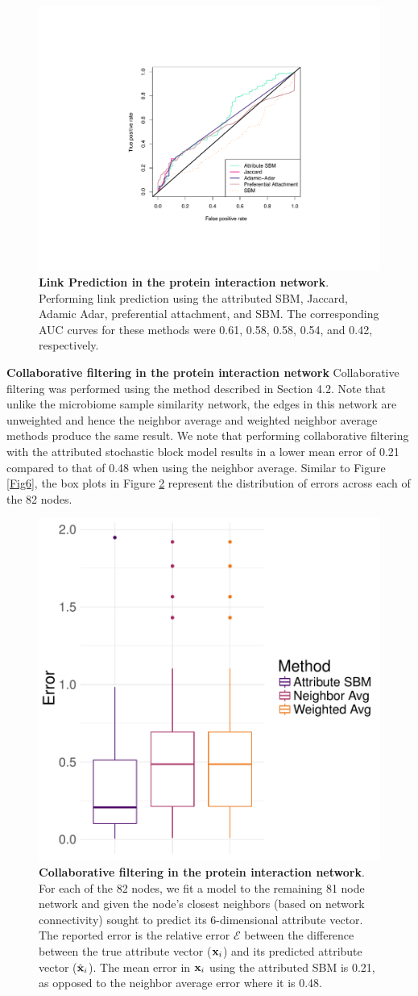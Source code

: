 \begin{figure}[h!]
\begin{center}
\includegraphics[width=.5\textwidth]{ROC_Protein.pdf}
\caption{{\bf Link Prediction in the protein interaction network}. Performing link prediction using the attributed SBM, Jaccard, Adamic Adar, preferential attachment, and SBM. The corresponding AUC curves for these methods were 0.61, 0.58, 0.58, 0.54, and 0.42, respectively.}
\label{Fig9}
\end{center}
\end{figure}
{\bf Collaborative filtering in the protein interaction network}
Collaborative filtering was performed using the method described in Section 4.2. Note that unlike the microbiome sample similarity network, the edges in this network are unweighted and hence the neighbor average and weighted neighbor average methods produce the same result. We note that performing collaborative filtering with the attributed stochastic block model results in a lower mean error of 0.21 compared to that of 0.48 when using the neighbor average. Similar to Figure \ref{Fig6}, the box plots in Figure \ref{collabprotein} represent the distribution of errors across each of the 82 nodes.

\begin{figure}[h!]
\begin{center}
\includegraphics[width=.5\textwidth]{CollabProtein.pdf}
\caption{{\bf Collaborative filtering in the protein interaction network}. For each of the 82 nodes, we fit a model to the remaining 81 node network and given the node's closest  neighbors (based on network connectivity) sought to predict its 6-dimensional attribute vector. The reported error is the relative error $\mathcal{E}$ between the difference between the true attribute vector (${\bf x}_{i}$) and its predicted attribute vector (${\hat{\bf x}}_{i}$). The mean error in ${\bf x}_{i}$ using the attributed SBM is 0.21, as opposed to the neighbor average error where it is 0.48. }
\label{collabprotein}
\end{center}
\end{figure}

